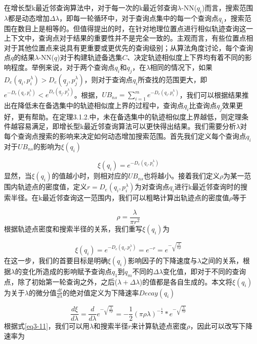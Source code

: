 在增长型k最近邻查询算法中，对于每一次的k最近邻查询$\lambda$-NN($q_{i}$)而言，搜索范围$\lambda$都是动态增加$\Delta\lambda$，即每一轮循环中，对于查询点集中的每一个查询点$q_{i}$，搜索范围在数目上是相等的。但值得提出的时，在针对地理位置点进行相似轨迹查询这一上下文中，查询点对于结果的重要性并不是完全一致的。主观而言，有些位置点相对于其他位置点来说具有更重要或更优先的查询级别；从算法角度讨论，每个查询点$q$的结果$\lambda$-NN($q$)对于构建轨迹备选集$C$、决定轨迹相似度上下界均有着不同的影响程度。举例来说，对于两个查询点$q_{i}$和$q_{j}$，在$\lambda$相同的情况下，如果$D_{e}(q_{i}, p_{i}^{\lambda}) > D_{e}(q_{j}, p_{j}^{\lambda})$，则对于查询点$q_{i}$所查找的范围更大，即$e^{-D_{e}(q_{i}, p_{i}^{\lambda})} < e^{D_{e}(q_{j}, p_{j}^{\lambda})}$。根据，$UB_{ns} = \sum_{i=1}^{m}e^{-D_{e}(q_{i}, p_{i}^{\lambda})}$，我们可以根据结果推出在降低未在备选集中的轨迹相似度上界的过程中，查询点$q_{i}$比查询点$q_{j}$效果更好，更有帮助。在定理3.1.2.中，未在备选集中的轨迹相似度上界越低，则定理条件越容易满足，即增长型k最近邻查询算法可以更快得出结果。我们需要分析$\lambda$对每个查询点搜索的影响来决定如何动态增加搜索范围。首先我们定义每个查询点$q_i$对于$UB_{ns}$的影响为$\xi (q_i)$

\begin{displaymath}
	\xi (q_i) = e^{-D_{e}(q_i,p_i^\lambda)}
\end{displaymath}
显然，当$\xi (q_i)$的值越小时，则相对应的$UB_{ns}$也将越小。接着我们定义$\rho$为某一范围内轨迹点的密度值，定义$r=D_{e}(q_i,p_i^\lambda)$为对查询点$q_i$进行k最近邻查询时的搜索半径。在k最近邻查询这一范围内，我们可以粗略计算出轨迹点的密度值$\rho$等于

\begin{displaymath}
	\rho = \frac{\lambda}{\pi r^{2}}
\end{displaymath}
根据轨迹点密度和搜索半径的关系，我们重写$\xi (q_i)$为

\begin{displaymath}
	\xi (q_i) = e^{-D_{e}(q_i,p_i^\lambda)} = e^{-r} = e^{-\sqrt{\frac{\lambda}{\pi\rho}}}
\end{displaymath}
在这一步，我们的首要目标是明确$\xi (q_i)$影响因子的下降速度与$\lambda$之间的关系，根据$\lambda$的变化所造成的影响赋予查询点$q_1$到$q_m$不同的$\Delta\lambda$变化值，即对于不同的查询点，除了初始第一轮查询之外，之后($\lambda+\Delta\lambda$)的值都是各自生成的。本文将$\xi (q_i)$为关于$\lambda$的微分值$\frac{d\xi}{d\lambda}$的绝对值定义为下降速率$Decay(q_i)$

\begin{equation}
\label{eq3-11}
\frac{d\xi}{d\lambda} = \frac{d}{d\lambda}e^{-\sqrt{\frac{\lambda}{\pi\rho}}} = -\frac{1}{2}(\pi\rho\lambda)^{-\frac{1}{2}}*e^{-\sqrt{\frac{\lambda}{\pi\rho}}}
\end{equation}
根据式\ref{eq3-11}，我们可以用$\lambda$和搜索半径$r$来计算轨迹点密度$\rho$，因此可以改写下降速率为

